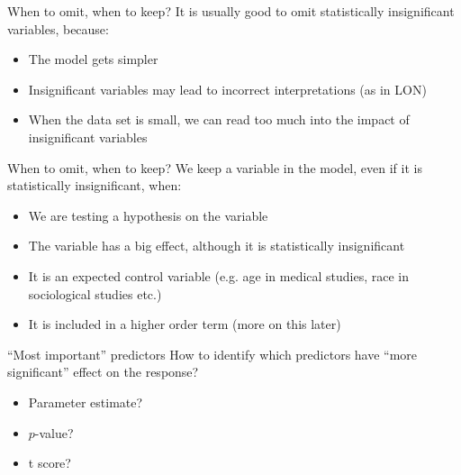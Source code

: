 \documentclass{beamer}\usepackage[]{graphicx}\usepackage[]{color}
\begin{document}
\begin{darkframes}
    \begin{frame}{When to omit, when to keep?}
      It is usually good to omit statistically insignificant variables, because:
      \begin{itemize}
        \item The model gets simpler
        \item Insignificant variables may lead to incorrect interpretations (as in LON)
        \item When the data set is small, we can read too much into the impact of insignificant variables
      \end{itemize}

    \end{frame}

    \begin{frame}{When to omit, when to keep?}
      We keep a variable in the model, even if it is statistically insignificant, when:
      \begin{itemize}
        \item We are testing a hypothesis on the variable
        \item The variable has a big effect, although it is statistically insignificant
        \item It is an expected control variable (e.g. age in medical studies, race in sociological studies etc.)
        \item It is included in a higher order term (more on this later)

      \end{itemize}

    \end{frame}


    \begin{frame}{``Most important'' predictors}
      How to identify which predictors have ``more significant'' effect on the response?

      \begin{itemize}
        \item[] Parameter estimate? \pause
        \item[] $p$-value? \pause
        \item[] t score? \pause \greencheckmark

      \end{itemize}

    \end{frame}



\end{darkframes}
\end{document}
